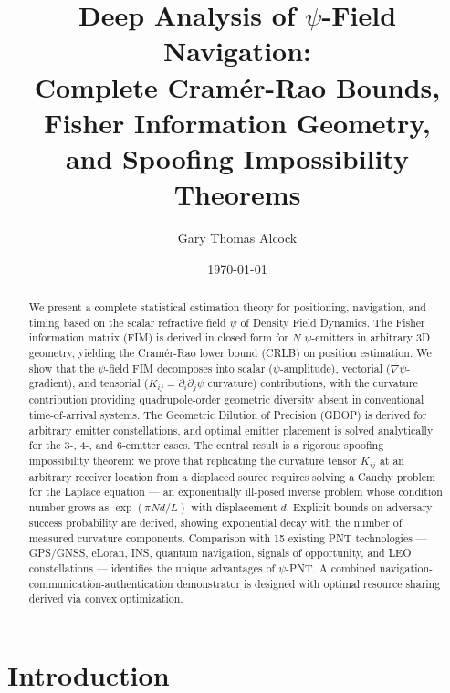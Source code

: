 \documentclass[twocolumn,superscriptaddress,prd,nofootinbib]{revtex4-2}
\begin{document}
\title{Deep Analysis of $\psi$-Field Navigation:\\
Complete Cram\'er-Rao Bounds, Fisher Information Geometry,\\
and Spoofing Impossibility Theorems}

\author{Gary Thomas Alcock}

\date{\today}

\begin{abstract}
We present a complete statistical estimation theory for positioning,
navigation, and timing based on the scalar refractive field $\psi$ of
Density Field Dynamics. The Fisher information matrix (FIM) is derived
in closed form for $N$ $\psi$-emitters in arbitrary 3D geometry, yielding
the Cram\'er-Rao lower bound (CRLB) on position estimation. We show that
the $\psi$-field FIM decomposes into scalar ($\psi$-amplitude),
vectorial ($\nabla\psi$-gradient), and tensorial ($K_{ij} = \partial_i\partial_j\psi$
curvature) contributions, with the curvature contribution providing
quadrupole-order geometric diversity absent in conventional
time-of-arrival systems. The Geometric Dilution of Precision (GDOP) is
derived for arbitrary emitter constellations, and optimal emitter
placement is solved analytically for the 3-, 4-, and 6-emitter cases.
The central result is a rigorous spoofing impossibility theorem: we prove
that replicating the curvature tensor $K_{ij}$ at an arbitrary receiver
location from a displaced source requires solving a Cauchy problem for
the Laplace equation --- an exponentially ill-posed inverse problem whose
condition number grows as $\exp(\pi N d/L)$ with displacement $d$.
Explicit bounds on adversary success probability are derived, showing
exponential decay with the number of measured curvature components.
Comparison with 15 existing PNT technologies --- GPS/GNSS, eLoran,
INS, quantum navigation, signals of opportunity, and LEO constellations
--- identifies the unique advantages of $\psi$-PNT. A combined
navigation-communication-authentication demonstrator is designed with
optimal resource sharing derived via convex optimization.
\end{abstract}

\maketitle
\tableofcontents

\section{Introduction}\label{sec:intro}
\end{document}
